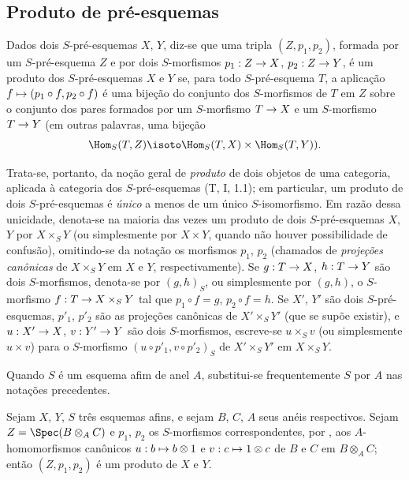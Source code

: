 \documentclass[oneside]{amsart}
\makeatletter
\newcommand{\ega@arrow}[2]{\mathchoice{#1}{#2}{#2}{#2}}
\let\ega@shortmapsto\mapsto
\renewcommand{\to}{\ega@arrow{\longrightarrow}{\rightarrow}}
\renewcommand{\mapsto}{\ega@arrow{\longmapsto}{\ega@shortmapsto}}
\newcommand{\oldpage}[2][]{{\marginnote{\normalfont\textbf{#1}~|~#2}}\ignorespaces}
\let\EGAOriginalLabel\label
\renewcommand{\label}[1]{\phantomsection\EGAOriginalLabel{#1}}
\makeatother
\begin{document}
\subsection{Produto de pré-esquemas}
\label{subsection:I.3.2}

\begin{definition}[3.2.1]
\label{I.3.2.1}
Dados dois $S$-pré-esquemas $X$, $Y$, diz-se que uma tripla $(Z,p_1,p_2)$,
formada por um $S$-pré-esquema $Z$ e por dois $S$-morfismos $p_1:Z\to X$,
$p_2:Z\to Y$, é um produto dos
\oldpage[I]{105}
$S$-pré-esquemas $X$ e $Y$ se, para todo $S$-pré-esquema $T$, a aplicação
$f\mapsto(p_1\circ f,p_2\circ f)$ é uma bijeção do conjunto dos
$S$-morfismos de $T$ em $Z$ sobre o conjunto dos pares formados por um
$S$-morfismo $T\to X$ e um $S$-morfismo $T\to Y$ (em outras palavras, uma
bijeção
\[
  \Hom_S(T,Z)\isoto\Hom_S(T,X)\times\Hom_S(T,Y)).
\]
\end{definition}

Trata-se, portanto, da noção geral de \emph{produto} de dois objetos de uma
categoria, aplicada à categoria dos $S$-pré-esquemas (T, I, 1.1); em
particular, um produto de dois $S$-pré-esquemas é \emph{único} a menos de um
único $S$-isomorfismo. Em razão dessa unicidade, denota-se na maioria das
vezes um produto de dois $S$-pré-esquemas $X$, $Y$ por $X\times_S Y$ (ou
simplesmente por $X\times Y$, quando não houver possibilidade de confusão),
omitindo-se da notação os morfismos $p_1$, $p_2$ (chamados de
\emph{projeções canônicas} de $X\times_S Y$ em $X$ e $Y$, respectivamente).
Se $g:T\to X$, $h:T\to Y$ são dois $S$-morfismos, denota-se por $(g,h)_S$, ou
simplesmente por $(g,h)$, o $S$-morfismo $f:T\to X\times_S Y$ tal que
$p_1\circ f=g$, $p_2\circ f=h$. Se $X'$, $Y'$ são dois $S$-pré-esquemas,
$p'_1$, $p'_2$ são as projeções canônicas de $X'\times_S Y'$ (que se supõe
existir), e $u:X'\to X$, $v:Y'\to Y$ são dois $S$-morfismos, escreve-se
$u\times_S v$ (ou simplesmente $u\times v$) para o $S$-morfismo
$(u\circ p'_1,v\circ p'_2)_S$ de $X'\times_S Y'$ em $X\times_S Y$.

Quando $S$ é um esquema afim de anel $A$, substitui-se frequentemente $S$ por
$A$ nas notações precedentes.

\begin{proposition}[3.2.2]
\label{I.3.2.2}
Sejam $X$, $Y$, $S$ três esquemas afins, e sejam $B$, $C$, $A$ seus anéis
respectivos. Sejam $Z=\Spec(B\otimes_A C)$ e $p_1$, $p_2$ os $S$-morfismos
correspondentes, por , aos $A$-homomorfismos canônicos
$u:b\mapsto b\otimes1$ e $v:c\mapsto1\otimes c$ de $B$ e $C$ em
$B\otimes_A C$; então $(Z,p_1,p_2)$ é um produto de $X$ e $Y$.
\end{proposition}
\end{document}
